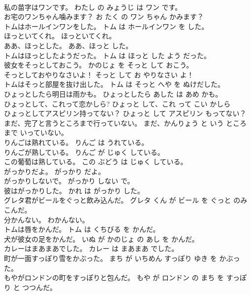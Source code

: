 \documentclass[8pt]{extreport}
\begin{document}
\begin{CJK}{UTF8}{min}
\\	私の苗字はワンです。	わたし の みょうじ は ワン です。	
\\	お宅のワンちゃん噛みます？	お たく の ワン ちゃん かみます？	
\\	トムはホールインワンをした。	トム は ホールインワン を した。	
\\	ほっといてくれ。	ほっといてくれ。	
\\	ああ、ほっとした。	ああ、ほっと した。	
\\	トムはほっとしたようだった。	トム は ほっと した よう だった。	
\\	彼女をそっとしておこう。	かのじょ を そっと して おこう。	
\\	そっとしておやりなさいよ！	そっと して お やりなさい よ！	
\\	トムはそっと部屋を抜け出した。	トム は そっと へや を ぬけだした。	
\\	ひょっとしたら明日は雨かも。	ひょっとしたら あした は あめ かも。	
\\	ひょっとして、これって恋かしら?	ひょっと して、これ って こい かしら 
\\	ひょっとしてアスピリン持ってない？	ひょっと して アスピリン もってない？	
\\	まだ、完了と言うところまで行っていない。	まだ、かんりょう と いう ところ まで いっていない。	
\\	りんごは熟れている。	りんご は うれている。	
\\	りんごが熟している。	りんご が じゅく している。	
\\	この葡萄は熟している。	この ぶどう は じゅく している。	
\\	がっかりだよ。	がっかり だよ。	
\\	がっかりしないで。	がっかり しない で。	
\\	彼はがっかりした。	かれ は がっかり した。	
\\	グレタ君がビールをぐっと飲み込んだ。	グレタ くん が ビール を ぐっと のみこんだ。	
\\	分かんない。	わかんない。	
\\	トムは唇をかんだ。	トム は くちびる を かんだ。	
\\	犬が彼女の足をかんだ。	いぬ が かのじょ の あし を かんだ。	
\\	カレーはまあまあでした。	カレー は まあまあ でした。	
\\	町が一面すっぽり雪をかぶった。	まち が いちめん すっぽり ゆき を かぶった。	
\\	もやがロンドンの町をすっぽりと包んだ。	もや が ロンドン の まち を すっぽり と つつんだ。	

\end{CJK}
\end{document}
